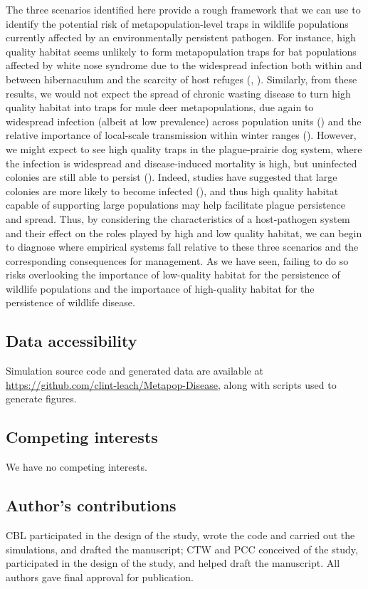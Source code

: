 \documentclass{article}
\begin{document}
The three scenarios identified here provide a rough framework that we can use to identify the potential risk of metapopulation-level traps in wildlife populations currently affected by an environmentally persistent pathogen.
For instance, high quality habitat seems unlikely to form metapopulation traps for bat populations affected by white nose syndrome due to the widespread infection both within and between hibernaculum and the scarcity of host refuges (\cite{Langwig2014}, \cite{ORegan2015}).
Similarly, from these results, we would not expect the spread of chronic wasting disease to turn high quality habitat into traps for mule deer metapopulations, due again to widespread infection (albeit at low prevalence) across population units (\cite{Conner2004}) and the relative importance of local-scale transmission within winter ranges (\cite{Farnsworth2006}).
However, we might expect to see high quality traps in the plague-prairie dog system, where the infection is widespread and disease-induced mortality is high, but uninfected colonies are still able to persist (\cite{Stapp2004}).
Indeed, studies have suggested that large colonies are more likely to become infected (\cite{Snall2008}), and thus high quality habitat capable of supporting large populations may help facilitate plague persistence and spread.
Thus, by considering the characteristics of a host-pathogen system and their effect on the roles played by high and low quality habitat, we can begin to diagnose where empirical systems fall relative to these three scenarios and the corresponding consequences for management.
As we have seen, failing to do so risks overlooking the importance of low-quality habitat for the persistence of wildlife populations and the importance of high-quality habitat for the persistence of wildlife disease.

\subsection*{Data accessibility}
Simulation source code and generated data are available at \url{https://github.com/clint-leach/Metapop-Disease}, along with scripts used to generate figures.

\subsection*{Competing interests}
We have no competing interests.

\subsection*{Author's contributions}
CBL participated in the design of the study, wrote the code and carried out the simulations, and drafted the manuscript; CTW and PCC conceived of the study, participated in the design of the study, and helped draft the manuscript.  All authors gave final approval for publication.
\end{document}
